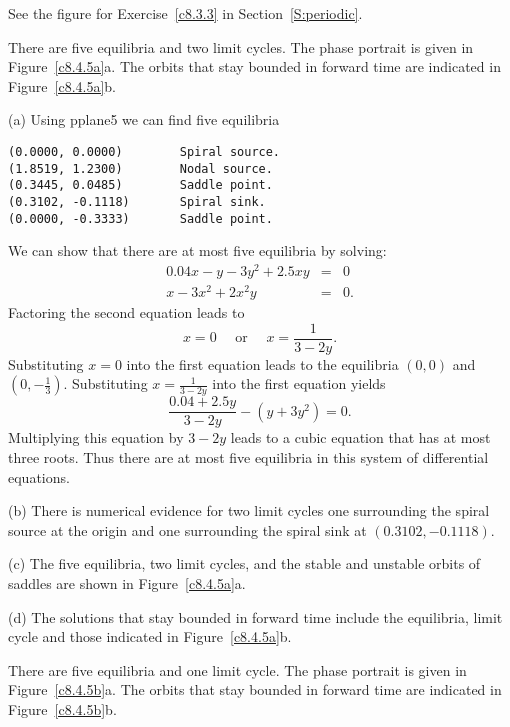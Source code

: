   See the figure for Exercise~\ref{c8.3.3} in
Section~\ref{S:periodic}.

\ans There are five equilibria and two limit cycles.  The phase portrait is
given in Figure~\ref{c8.4.5a}a.  The orbits that stay bounded in
forward time are indicated in Figure~\ref{c8.4.5a}b.

\soln (a)  Using {\sf pplane5} we can find five equilibria
\begin{verbatim}
(0.0000, 0.0000)        Spiral source.           
(1.8519, 1.2300)        Nodal source.            
(0.3445, 0.0485)        Saddle point.            
(0.3102, -0.1118)       Spiral sink.             
(0.0000, -0.3333)       Saddle point.            
\end{verbatim}
We can show that there are at most five equilibria by solving:
\begin{eqnarray*}
0.04x - y - 3y^2 + 2.5xy & = & 0\\
x - 3x^2 + 2x^2y & = & 0.
\end{eqnarray*}  
Factoring the second equation leads to 
\[
x=0 \quad \mbox{ or } \quad x = \frac{1}{3-2y}.
\]
Substituting $x=0$ into the first equation leads to the equilibria
$(0,0)$ and $(0,-\frac{1}{3})$. Substituting $x = \frac{1}{3-2y}$ into the
first equation yields
\[
\frac{0.04+2.5y}{3-2y} -(y+3y^2)=0.
\]
Multiplying this equation by $3-2y$ leads to a cubic equation that has at most
three roots.  Thus there are at most five equilibria in this system of
differential equations.

\noindent (b) There is numerical evidence for two limit cycles
one surrounding the spiral source at the origin and one surrounding the
spiral sink at $(0.3102, -0.1118)$.

\noindent (c)  The five equilibria, two limit cycles, and the stable and
unstable orbits of saddles are shown in Figure~\ref{c8.4.5a}a.

\noindent (d)  The solutions that stay bounded in forward time include the
equilibria, limit cycle and those indicated in Figure~\ref{c8.4.5a}b.

\begin{figure}[htb]
                       \centerline{%
			}
\end{figure}




\ans There are five equilibria and one limit cycle.  The phase portrait is
given in Figure~\ref{c8.4.5b}a.  The orbits that stay bounded in forward time
are indicated in Figure~\ref{c8.4.5b}b.

